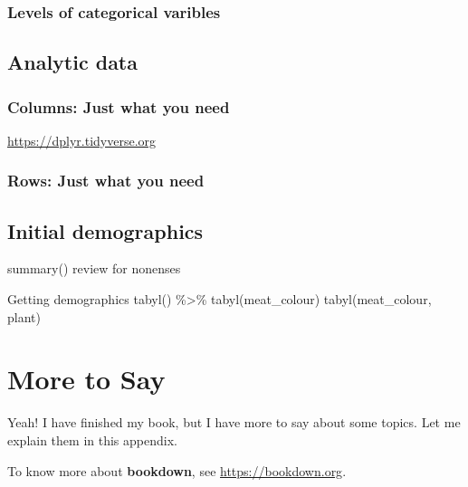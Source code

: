 \documentclass[
]{krantz}
\begin{document}
\hypertarget{levels-of-categorical-varibles}{%
\subsection{Levels of categorical varibles}\label{levels-of-categorical-varibles}}

\hypertarget{analytic-data}{%
\section{Analytic data}\label{analytic-data}}

\hypertarget{columns-just-what-you-need}{%
\subsection{Columns: Just what you need}\label{columns-just-what-you-need}}

\url{https://dplyr.tidyverse.org}

\hypertarget{rows-just-what-you-need}{%
\subsection{Rows: Just what you need}\label{rows-just-what-you-need}}

\hypertarget{initial-demographics}{%
\section{Initial demographics}\label{initial-demographics}}

summary() review for nonenses

Getting demographics
tabyl()
\%\textgreater\% tabyl(meat\_colour)
tabyl(meat\_colour, plant)

\cleardoublepage

\hypertarget{appendix-appendix}{%
\appendix {}}


\hypertarget{more-to-say}{%
\chapter{More to Say}\label{more-to-say}}

Yeah! I have finished my book, but I have more to say about some topics. Let me explain them in this appendix.

To know more about \textbf{bookdown}, see \url{https://bookdown.org}.

  

\backmatter
\printindex
\end{document}
